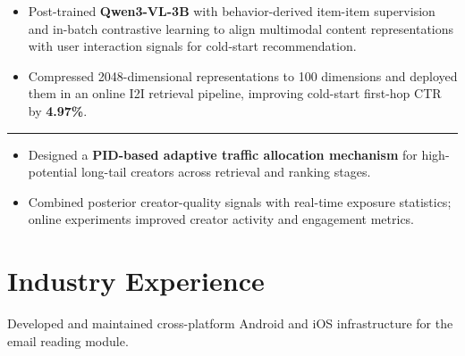 \documentclass{resume}
\begin{document}
\begin{itemize}

\item
Post-trained \textbf{Qwen3-VL-3B} with behavior-derived item-item supervision
and in-batch contrastive learning to align multimodal content representations
with user interaction signals for cold-start recommendation.

\item
Compressed 2048-dimensional representations to 100 dimensions and deployed
them in an online I2I retrieval pipeline, improving cold-start first-hop CTR
by \textbf{4.97\%}.

\end{itemize}

\vspace{-0.3em}
\noindent\rule{\textwidth}{0.2pt}


\begin{itemize}

\item
Designed a \textbf{PID-based adaptive traffic allocation mechanism} for
high-potential long-tail creators across retrieval and ranking stages.

\item
Combined posterior creator-quality signals with real-time exposure statistics;
online experiments improved creator activity and engagement metrics.

\end{itemize}

\section{Industry Experience}


Developed and maintained cross-platform Android and iOS infrastructure for
the email reading module.
\end{document}
